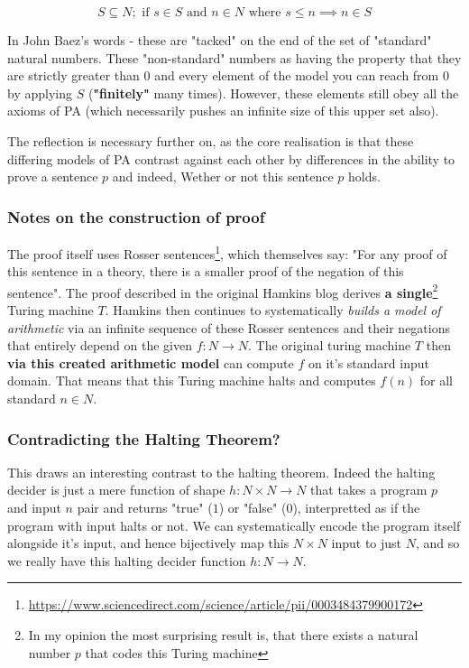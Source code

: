 \documentclass{article}
\begin{document}
\begin{equation}
	S \subseteq N; \text{ if } s \in S \text { and } n \in N \text{ where } s \leq n \implies n \in S
\end{equation}

In John Baez's words - these are "tacked" on the end of the set of "standard" natural numbers. These "non-standard" numbers as having the property that they are strictly greater than $0$ and every element of the model you can reach from 0 by applying $S$ (\textbf{"finitely"} many times). However, these elements still obey all the axioms of PA (which necessarily pushes an infinite size of this upper set also).

The reflection is necessary further on, as the core realisation is that these differing models of PA contrast against each other by differences in the ability to prove a sentence $p$ and indeed, Wether or not this sentence $p$ holds.

\subsubsection{Notes on the construction of proof}
The proof itself uses Rosser sentences\footnote{\url{https://www.sciencedirect.com/science/article/pii/0003484379900172}}, which themselves say: "For any proof of this sentence in a theory, there is a smaller proof of the negation of this sentence". The proof described in the original Hamkins blog derives \textbf{a single}\footnote{In my opinion the most surprising result is, that there exists a natural number $p$ that codes this Turing machine} Turing machine $T$. Hamkins then continues to systematically \emph{builds a model of arithmetic} via an infinite sequence of these Rosser sentences and their negations that entirely depend on the given $f: N \rightarrow N$. The original turing machine $T$ then \textbf{via this created arithmetic model} can compute $f$ on it's standard input domain. That means that this Turing machine halts and computes $f(n)$ for all standard $n \in N$.

\subsubsection{Contradicting the Halting Theorem?}
This draws an interesting contrast to the halting theorem. Indeed the halting decider is just a mere function of shape $h: N \times N \rightarrow N$ that takes a program $p$ and input $n$ pair and returns "true" ($1$) or "false" ($0$), interpretted as if the program with input halts or not. We can systematically encode the program itself alongside it's input, and hence bijectively map this $N \times N$ input to just $N$, and so we really have this halting decider function $h: N \rightarrow N$.
\end{document}
